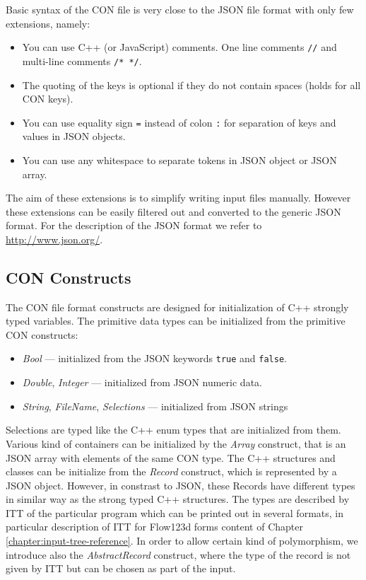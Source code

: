 Basic syntax of the CON file is very close to the JSON file format with only few extensions, namely:
\begin{itemize}
\item You can use C++ (or JavaScript) comments. One line comments \verb'//' and multi-line comments \verb'/* */'.
\item The quoting of the keys is optional if they do not contain spaces (holds for all CON keys).
\item You can use equality sign \verb'=' instead of colon \verb':' for separation of keys and values in JSON objects.
\item You can use any whitespace to separate tokens in JSON object or JSON array.
\end{itemize}
The aim of these extensions is to simplify writing input files manually. However these extensions can be easily filtered out and converted to 
the generic JSON format. For the description of the JSON format we refer to \url{http://www.json.org/}. 

\subsection{CON Constructs}
The CON file format constructs are designed for initialization of C++ strongly typed variables. The primitive data types can be initialized from 
the primitive CON constructs: 
\begin{itemize}
 \item {\it Bool} --- initialized from the JSON keywords \verb'true' and \verb'false'.
 \item {\it Double}, {\it Integer} --- initialized from JSON numeric data. 
 \item {\it String}, {\it FileName}, {\it Selections} --- initialized from JSON strings
\end{itemize}
Selections are typed like the C++ enum types that are initialized from them.
Various kind of containers can be initialized by the {\it Array} construct, that is an JSON array with elements of the same CON type. 
The C++ structures and classes can be initialize from the {\it Record} construct, which is represented by a JSON object. However, in constrast to JSON,
these Records have different types in similar way as the strong typed C++ structures. The types are described by ITT of the particular program
which can be printed out in several formats, in particular description of ITT for Flow123d forms content of Chapter \ref{chapter:input-tree-reference}.
In order to allow certain kind of polymorphism, we introduce also the {\it AbstractRecord} construct, where the type of the record is not given by ITT but 
can be chosen as part of the input. 

